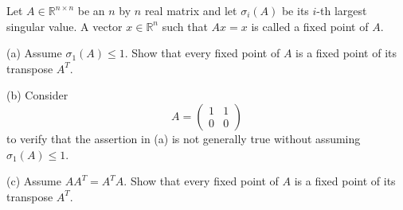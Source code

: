 \begin{exercise}
\label{applied:2026:5}
Let $A\in \mathbb{R}^{n\times n}$ be an $n$ by $n$ real matrix and let $\sigma_i(A)$ be its
$i$-th largest singular value. A vector $x\in \mathbb{R}^n$ such that $Ax=x$ is called a fixed
point of $A$.

(a) Assume $\sigma_1(A)\leq 1$. Show that every fixed point of $A$ is a fixed point of its
transpose $A^T$.

(b) Consider
\[
A=
\begin{pmatrix}
1 & 1\\
0 & 0
\end{pmatrix}
\]
to verify that the assertion in (a) is not generally true without assuming $\sigma_1(A)\leq 1$.

(c) Assume $AA^T=A^TA$. Show that every fixed point of $A$ is a fixed point of its transpose
$A^T$.
\end{exercise}

